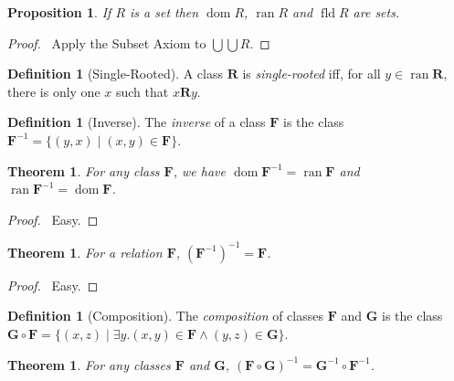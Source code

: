 \documentclass{article}
\let\qed\relax
\newtheorem{proposition}[axiom]{Proposition}
\newtheorem{theorem}[axiom]{Theorem}
\theoremstyle{definition}
\newtheorem{definition}[axiom]{Definition}
\newcommand{\dom}{\ensuremath{\operatorname{dom}}}
\newcommand{\fld}{\ensuremath{\operatorname{fld}}}
\newcommand{\inv}[1]{\ensuremath{{#1}^{-1}}}
\newcommand{\ran}{\ensuremath{\operatorname{ran}}}
\begin{document}
    \begin{proposition}
        If $R$ is a set then $\dom R$, $\ran R$ and $\fld R$ are sets.
    \end{proposition}

    \begin{proof}
        \pf\ Apply the Subset Axiom to $\bigcup \bigcup R$. \qed
    \end{proof}
    
    \begin{definition}[Single-Rooted]
        A class $\mathbf{R}$ is \emph{single-rooted} iff, for all $y \in \ran \mathbf{R}$,
        there is only one $x$ such that $x \mathbf{R} y$.
    \end{definition}

    \begin{definition}[Inverse]
        The \emph{inverse} of a class $\mathbf{F}$ is the class $\mathbf{F}^{-1} = \{ (y,x)
        \mid (x,y) \in \mathbf{F} \}$.
    \end{definition}

    \begin{theorem}
        For any class $\mathbf{F}$, we have $\dom \mathbf{F}^{-1} = \ran \mathbf{F}$
        and $\ran \mathbf{F}^{-1} = \dom \mathbf{F}$.
    \end{theorem}

    \begin{proof}
        \pf\ Easy. \qed
    \end{proof}

    \begin{theorem}
        For a relation $\mathbf{F}$, $(\mathbf{F}^{-1})^{-1} = \mathbf{F}$.
    \end{theorem}

    \begin{proof}
        \pf\ Easy. \qed
    \end{proof}

    \begin{definition}[Composition]
        The \emph{composition} of classes $\mathbf{F}$ and $\mathbf{G}$ is the class
        $\mathbf{G} \circ \mathbf{F} = \{ (x,z) \mid \exists y. (x,y) \in \mathbf{F} \wedge (y,z) \in \mathbf{G} \}$.
    \end{definition}

    \begin{theorem}
        For any classes $\mathbf{F}$ and $\mathbf{G}$, $\inv{(\mathbf{F} \circ \mathbf{G})} =
        \inv{\mathbf{G}} \circ \inv{\mathbf{F}}$.
    \end{theorem}
\end{document}
